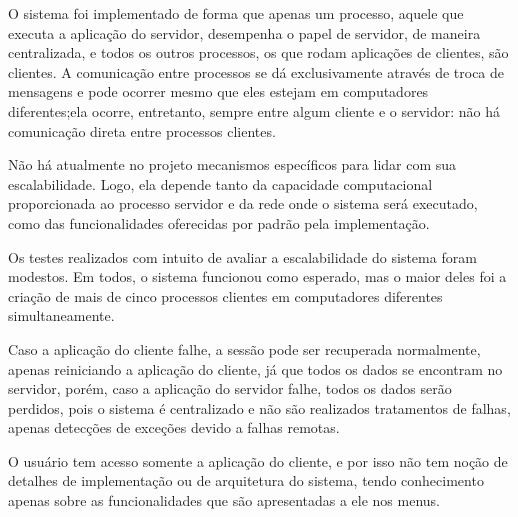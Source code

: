 \documentclass[../main.tex]{subfiles}
\begin{document}
O sistema foi implementado de forma que apenas um processo, aquele que executa a aplicação do servidor, desempenha o papel de servidor, de maneira centralizada, e todos os outros processos, os que rodam aplicações de clientes, são clientes.
A comunicação entre processos se dá exclusivamente através de troca de mensagens e pode ocorrer mesmo que eles estejam em computadores diferentes;ela ocorre, entretanto, sempre entre algum cliente e o servidor: não há comunicação direta entre processos clientes.

Não há atualmente no projeto mecanismos específicos para lidar com sua escalabilidade.
Logo, ela depende tanto da capacidade computacional proporcionada ao processo servidor e da rede onde o sistema será executado, como das funcionalidades oferecidas por padrão pela implementação.

Os testes realizados com intuito de avaliar a escalabilidade do sistema foram modestos.
Em todos, o sistema funcionou como esperado, mas o maior deles foi a criação de mais de cinco processos clientes em computadores diferentes simultaneamente.

Caso a aplicação do cliente falhe, a sessão pode ser recuperada normalmente, apenas reiniciando a aplicação do cliente, já que todos os dados se encontram no servidor, porém, caso a aplicação do servidor falhe, todos os dados serão perdidos, pois o sistema é centralizado e não são realizados tratamentos de falhas, apenas detecções de exceções devido a falhas remotas.

O usuário tem acesso somente a aplicação do cliente, e por isso não tem noção de detalhes de implementação ou de arquitetura do sistema, tendo conhecimento apenas sobre as funcionalidades que são apresentadas a ele nos menus.
\end{document}
